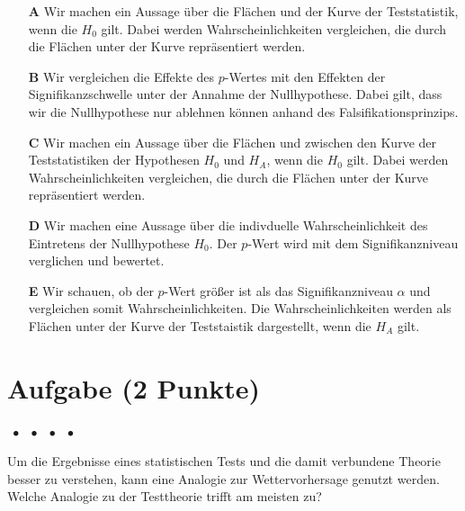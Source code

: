 \documentclass[a4paper, 9pt]{scrartcl}\usepackage[]{graphicx}\usepackage[]{xcolor}
\begin{document}
\begin{enumerate}
\item [\textbf{A} \msquare] Wir machen ein Aussage über die Flächen und der Kurve der Teststatistik, wenn die $H_0$ gilt. Dabei werden Wahrscheinlichkeiten vergleichen, die durch die Flächen unter der Kurve repräsentiert werden.
\item [\textbf{B} \msquare] Wir vergleichen die Effekte des $p$-Wertes mit den Effekten der Signifikanzschwelle unter der Annahme der Nullhypothese. Dabei gilt, dass wir die Nullhypothese nur ablehnen können anhand des Falsifikationsprinzips.
\item [\textbf{C} \msquare] Wir machen ein Aussage über die Flächen und zwischen den Kurve der Teststatistiken der Hypothesen $H_0$ und $H_A$, wenn die $H_0$ gilt. Dabei werden Wahrscheinlichkeiten vergleichen, die durch die Flächen unter der Kurve repräsentiert werden.
\item [\textbf{D} \msquare] Wir machen eine Aussage über die indivduelle Wahrscheinlichkeit des Eintretens der Nullhypothese $H_0$. Der $p$-Wert wird mit dem Signifikanzniveau verglichen und bewertet.
\item [\textbf{E} \msquare] Wir schauen, ob der $p$-Wert größer ist als das Signifikanzniveau $\alpha$ und vergleichen somit Wahrscheinlichkeiten. Die Wahrscheinlichkeiten werden als Flächen unter der Kurve der Teststaistik dargestellt, wenn die $H_A$ gilt.
\end{enumerate}

\section{Aufgabe \hfill (2 Punkte)}

\ifcollection
\begin{flushright}
\tiny\vspace{-2Ex}
\textbf{\examinhaltstart}
\exammodulemathstat $\;\bullet$
\exammodulestat $\;\bullet$
\exammodulestatbbv $\;\bullet$
\exammodulestatversuch $\;\bullet$
\exammodulebiostat
\vspace{-1Ex}
\end{flushright}
\fi




Um die Ergebnisse eines statistischen Tests und die damit verbundene Theorie besser zu verstehen, kann eine Analogie zur Wettervorhersage genutzt werden. Welche Analogie zu der Testtheorie trifft am meisten zu?
\end{document}
